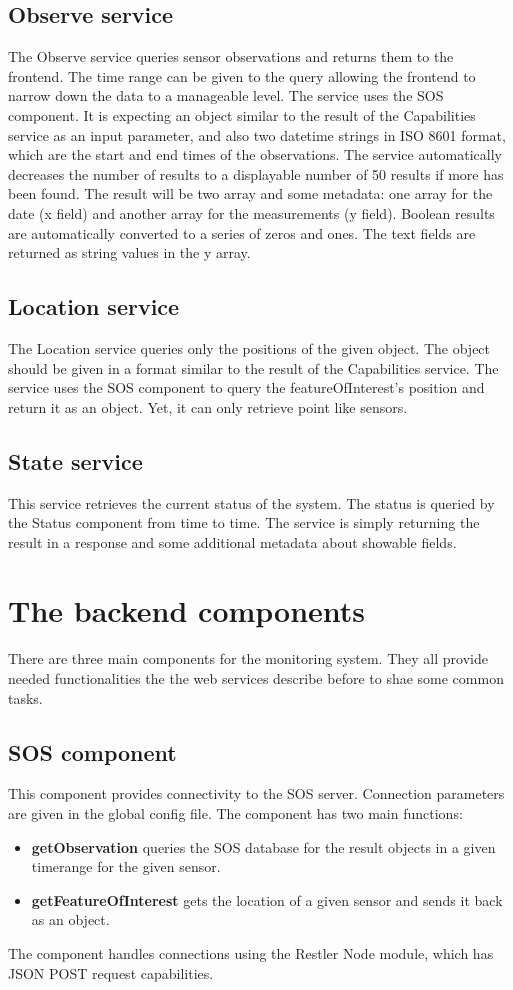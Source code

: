 \subsection{Observe service}
The Observe service queries sensor observations and returns them to the frontend.
The time range can be given to the query allowing the frontend to narrow down the data to a manageable level. The service uses the SOS component. It is expecting an object similar to the result of the Capabilities service as an input parameter, and also two datetime strings in ISO 8601 format, which are the start and end times of the observations. The service automatically decreases the number of results to a displayable number of 50 results if more has been found. The result will be two array and some metadata: one array for the date (x field) and another array for the measurements (y field). Boolean results are automatically converted to a series of zeros and ones. The text fields are returned as string values in the y array.

\subsection{Location service}
The Location service queries only the positions of the given object. The object should be given in a format similar to the result of the Capabilities service. The service uses the SOS component to query the featureOfInterest's position and return it as an object. Yet, it can only retrieve point like sensors.

\subsection{State service}
This service retrieves the current status of the system. The status is queried by the Status component from time to time. The service is simply returning the result in a response and some additional metadata about showable fields.

\section{The backend components}
There are three main components for the monitoring system. They all provide needed functionalities the the web services describe before to shae some common tasks.

\subsection{SOS component}
This component provides connectivity to the SOS server. Connection parameters are given in the global config file. The component has two main functions:
\begin{itemize}
\item \textbf{getObservation} queries the SOS database for the result objects in a given timerange for the given sensor.
\item \textbf{getFeatureOfInterest} gets the location of a given sensor and sends it back as an object.
\end{itemize}
The component handles connections using the Restler Node module, which has JSON POST request capabilities.

